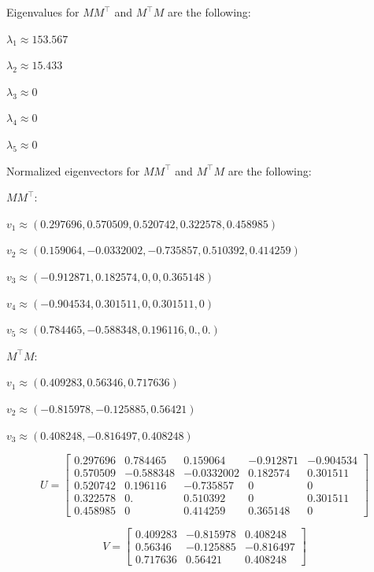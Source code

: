 \documentclass[12pt]{report}
\begin{document}
\begin{center}
Eigenvalues for $MM^\intercal$ and $M^\intercal  M$ are the following:

\hspace{3mm}

$\lambda_1 \approx 153.567$

$\lambda_2 \approx 15.433$

$\lambda_3 \approx 0$

$\lambda_4 \approx 0$

$\lambda_5 \approx 0$

\hspace{3mm}

Normalized eigenvectors for $MM^\intercal$ and $M^\intercal  M$ are the following:

\hspace{3mm}

$MM^\intercal$:

$v_1 \approx (0.297696, 0.570509, 0.520742, 0.322578, 0.458985) $

$v_2 \approx (0.159064, -0.0332002, -0.735857, 0.510392, 0.414259) $

$v_3 \approx(-0.912871, 0.182574, 0, 0, 0.365148) $

$v_4 \approx(-0.904534, 0.301511, 0, 0.301511, 0)$

$v_5 \approx(0.784465, -0.588348, 0.196116, 0., 0.) $

\hspace{3mm}

$M^\intercal  M$:

$v_1 \approx (0.409283, 0.56346, 0.717636) $

$v_2 \approx (-0.815978, -0.125885, 0.56421)$

$v_3 \approx (0.408248, -0.816497, 0.408248) $

\end{center}

\[
U =
\begin{bmatrix}
0.297696 & 0.784465  & 0.159064 & -0.912871 & -0.904534 \\
0.570509 & -0.588348  & -0.0332002 & 0.182574 & 0.301511 \\
0.520742 & 0.196116  & -0.735857 & 0 & 0 \\
0.322578 & 0.  & 0.510392 & 0 & 0.301511 \\
0.458985 & 0 & 0.414259 & 0.365148 & 0
\end{bmatrix}
\]

\[
V =
\begin{bmatrix}
0.409283 & -0.815978 & 0.408248 \\
0.56346 & -0.125885 & -0.816497 \\
0.717636 & 0.56421 & 0.408248
\end{bmatrix}
\]
\end{document}
